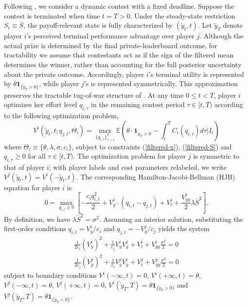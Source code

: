 \documentclass[mnsc]{informs3}
\begin{document}
Following \cite{Ryvkin2022Fight}, we consider a dynamic contest with a fixed deadline.
Suppose the contest is terminated when time $t=T>0$.
Under the steady-state restriction $S_t \equiv \bar S$, the payoff-relevant state is fully characterized by $(\tilde y_t,t)$.
Let $\tilde y_T$ denote player $i$'s perceived terminal performance advantage over player $j$.
Although the actual prize is determined by the final private-leaderboard outcome, for tractability we assume that contestants act as if the sign of the filtered mean determines the winner, rather than accounting for the full posterior uncertainty about the private outcome.
Accordingly, player \(i\)'s terminal utility is represented by \(\theta\mathbf 1_{\{\tilde y_T>0\}}\), while player \(j\)'s is represented symmetrically.
This approximation preserves the tractable tug-of-war structure of \citet{Ryvkin2022Fight}.
At any time $0\le t<T$, player $i$ optimizes her effort level $q_{i,\tau}$ in the remaining contest period $\tau\in[t, T)$ according to the following optimization problem,
\begin{equation}\label{v-def}
	V^i(\tilde{y}_{t}, t ; q_{j,t},\Theta_i) = \max_{\{q_{i,\tau}\}^T_{\tau=t}}
\mathbb{E}\left( \theta\cdot\mathbf{1}_{\tilde y_T>0} - \int^T_tC_i(q_{i,\tau})d\tau \bigg|I_t\right)
\end{equation}
where $\Theta_i \equiv\{\theta, \lambda, \sigma, c_i\}$, subject to constraints (\ref{filtered-x}), (\ref{filtered-S}) and $q_{i,\tau}\ge0$ for all $\tau\in[t,T)$.
The optimization problem for player $j$ is symmetric to that of player $i$; with player labels and cost parameters relabeled, we write $V^j(\tilde{y}_t, t) = V^i(-\tilde{y}_t, t)$.
The corresponding Hamilton-Jacobi-Bellman (HJB) equation for player $i$ is
\begin{equation*}
0 = \max_{q_{i,t}\ge0}\left[-\frac{c_iq_{i,t}^2}{2} + V^i_{y}\cdot\left(q_{i,t}-q_{j,t}\right)+V^i_t + \frac{V^i_{yy}}{2}\lambda \bar{S}^2\right].
\end{equation*}
By definition, we have $\lambda \bar{S}^2 = \sigma^2$.
Assuming an interior solution, substituting the first-order conditions $q_{i,t} = V^i_y/c_i$ and $q_{j,t} = -V^j_y/c_j$ yields the system
\begin{equation*}
\begin{aligned}
\frac{1}{2c_i}(V^i_y)^2 + \frac{1}{c_j}V^i_yV^j_y + V^i_t + V^i_{yy}\frac{\sigma^2}{2} = 0\\
\frac{1}{2c_j}(V^j_y)^2 + \frac{1}{c_i}V^j_yV^i_y + V^j_t + V^j_{yy}\frac{\sigma^2}{2} = 0
\end{aligned}
\end{equation*}
subject to boundary conditions $V^i(-\infty, t) = 0$, $V^i(+\infty, t) = \theta$, $V^j(-\infty, t) = \theta$, $V^j(+\infty, t)=0$, $V^i(\tilde{y}_T, T) = \theta \mathbf 1_{\{\tilde y_T>0\}}$ and $V^j(\tilde{y}_T, T) = \theta \mathbf 1_{\{\tilde y_T<0\}}$.
\end{document}

